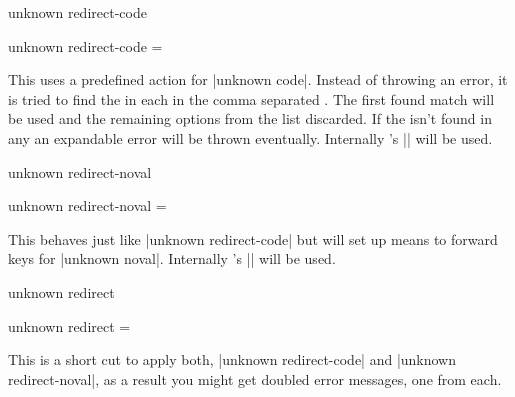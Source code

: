 
\begin{function}[module=expkv-def type]{unknown redirect-code}
  \begin{syntax}
    unknown redirect-code =  
  \end{syntax}
  This uses a predefined action for |unknown code|. Instead of throwing an
  error, it is tried to find the  in each  in the comma
  separated . The first found match will be used and the
  remaining options from the list discarded. If the  isn't found in
  any  an expandable error will be thrown eventually. Internally
  \expkv's |\ekvredirectunknown| will be used.
\end{function}

\begin{function}[module=expkv-def type]{unknown redirect-noval}
  \begin{syntax}
    unknown redirect-noval =  
  \end{syntax}
  This behaves just like |unknown redirect-code| but will set up means to
  forward keys for |unknown noval|. Internally \expkv's
  |\ekvredirectunknownNoVal| will be used.
\end{function}

\begin{function}[module=expkv-def type]{unknown redirect}
  \begin{syntax}
    unknown redirect =  
  \end{syntax}
  This is a short cut to apply both, |unknown redirect-code| and
  |unknown redirect-noval|, as a result you might get doubled error messages,
  one from each.
\end{function}


